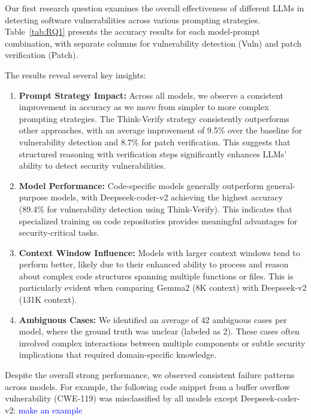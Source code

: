 \documentclass[sigconf,review,anonymous]{acmart}
\begin{document}
Our first research question examines the overall effectiveness of different LLMs in detecting software vulnerabilities across various prompting strategies. Table~\ref{tab:RQ1} presents the accuracy results for each model-prompt combination, with separate columns for vulnerability detection (Vuln) and patch verification (Patch).



The results reveal several key insights:

\begin{enumerate}
    \item \textbf{Prompt Strategy Impact:} Across all models, we observe a consistent improvement in accuracy as we move from simpler to more complex prompting strategies. The Think-Verify strategy consistently outperforms other approaches, with an average improvement of 9.5\% over the baseline for vulnerability detection and 8.7\% for patch verification. This suggests that structured reasoning with verification steps significantly enhances LLMs' ability to detect security vulnerabilities.
    
    \item \textbf{Model Performance:} Code-specific models generally outperform general-purpose models, with Deepseek-coder-v2 achieving the highest accuracy (89.4\% for vulnerability detection using Think-Verify). This indicates that specialized training on code repositories provides meaningful advantages for security-critical tasks.
    
    \item \textbf{Context Window Influence:} Models with larger context windows tend to perform better, likely due to their enhanced ability to process and reason about complex code structures spanning multiple functions or files. This is particularly evident when comparing Gemma2 (8K context) with Deepseek-v2 (131K context).
    
    \item \textbf{Ambiguous Cases:} We identified an average of 42 ambiguous cases per model, where the ground truth was unclear (labeled as 2). These cases often involved complex interactions between multiple components or subtle security implications that required domain-specific knowledge.
\end{enumerate}

Despite the overall strong performance, we observed consistent failure patterns across models. For example, the following code snippet from a buffer overflow vulnerability (CWE-119) was misclassified by all models except Deepseek-coder-v2: \textcolor{blue}{make an example}
\end{document}
